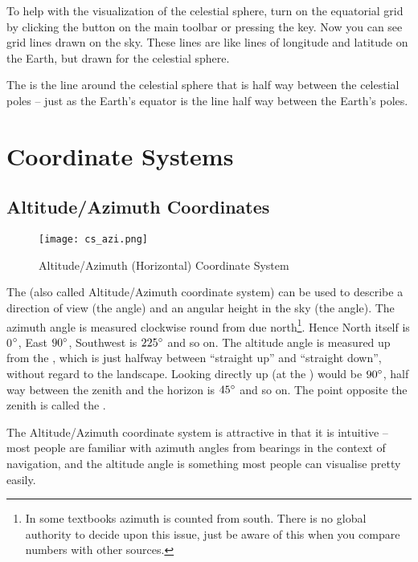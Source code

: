 To help with the visualization of the celestial sphere, turn on the
equatorial grid by clicking the button on the main toolbar or pressing
the  key. Now you can see grid lines drawn on the sky. These
lines are like lines of longitude and latitude on the Earth, but drawn
for the celestial sphere.

The  is the line around the celestial sphere
that is half way between the celestial poles -- just as the Earth's
equator is the line half way between the Earth's poles.




\section{Coordinate Systems}
\label{sec:Concepts:CoordinateSystems}

\subsection{Altitude/Azimuth Coordinates}
\label{sec:Concepts:AltAz}

\begin{figure}[ht]
\centering\texttt{[image: cs\_azi.png]}
\caption{Altitude/Azimuth (Horizontal) Coordinate System}
\label{fig:AltAz}
\end{figure}

The 
 (also called Altitude/Azimuth 
coordinate system) can be used to describe a
direction of view (the  angle) and an angular
height in the sky (the  angle). The azimuth angle
is measured clockwise round from due north\footnote{In some textbooks
  azimuth is counted from south. There is no global authority to
  decide upon this issue, just be aware of this when you compare
  numbers with other sources.}. Hence North itself is 0$\degree$, East
$90\degree$, Southwest is $225\degree$ and so on.  The altitude angle
is measured up from the , which is
just halfway between ``straight up'' and ``straight down'', without
regard to the landscape. Looking directly up (at the
) would be $90\degree$, half way between the zenith
and the horizon is $45\degree$ and so on. The point opposite the
zenith is called the .

The Altitude/Azimuth coordinate system is attractive in that it is
intuitive -- most people are familiar with azimuth angles from bearings
in the context of navigation, and the altitude angle is something most
people can visualise pretty easily.

